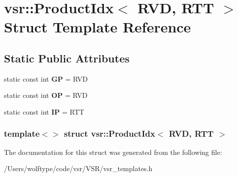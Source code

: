 \hypertarget{structvsr_1_1_product_idx_3_01_r_v_d_00_01_r_t_t_01_4}{\section{vsr\-:\-:Product\-Idx$<$ R\-V\-D, R\-T\-T $>$ Struct Template Reference}
\label{structvsr_1_1_product_idx_3_01_r_v_d_00_01_r_t_t_01_4}
}
\subsection*{Static Public Attributes}
\begin{DoxyCompactItemize}
\item 
\hypertarget{structvsr_1_1_product_idx_3_01_r_v_d_00_01_r_t_t_01_4_ad57dab1162520da67d0d9706311885e5}{static const int {\bfseries G\-P} = R\-V\-D}\label{structvsr_1_1_product_idx_3_01_r_v_d_00_01_r_t_t_01_4_ad57dab1162520da67d0d9706311885e5}

\item 
\hypertarget{structvsr_1_1_product_idx_3_01_r_v_d_00_01_r_t_t_01_4_a8d0b83b4efb883d55b495597695331ff}{static const int {\bfseries O\-P} = R\-V\-D}\label{structvsr_1_1_product_idx_3_01_r_v_d_00_01_r_t_t_01_4_a8d0b83b4efb883d55b495597695331ff}

\item 
\hypertarget{structvsr_1_1_product_idx_3_01_r_v_d_00_01_r_t_t_01_4_a22574f44b0b974601cb89cee88f79a7e}{static const int {\bfseries I\-P} = R\-T\-T}\label{structvsr_1_1_product_idx_3_01_r_v_d_00_01_r_t_t_01_4_a22574f44b0b974601cb89cee88f79a7e}

\end{DoxyCompactItemize}
\subsubsection*{template$<$$>$ struct vsr\-::\-Product\-Idx$<$ R\-V\-D, R\-T\-T $>$}



The documentation for this struct was generated from the following file\-:\begin{DoxyCompactItemize}
\item 
/\-Users/wolftype/code/vsr/\-V\-S\-R/vsr\-\_\-templates.\-h\end{DoxyCompactItemize}
